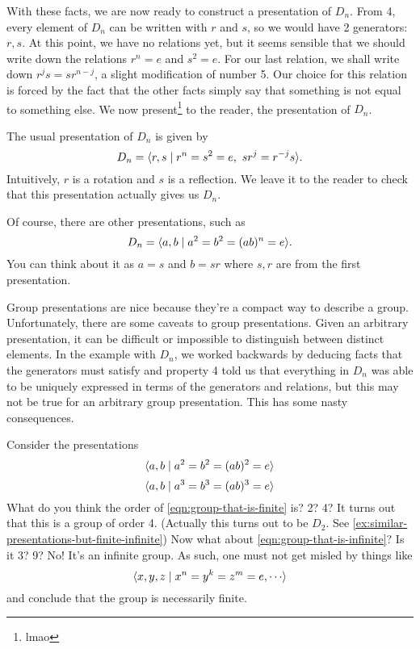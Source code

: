 \documentclass[./main.tex]{subfiles}
\begin{document}
With these facts, we are now ready to construct a presentation of $D_n$. From 4,
every element of $D_n$ can be written with $r$ and $s$, so we would have 2
generators: $r, s$. At this point, we have no relations yet, but it seems
sensible that we should write down the relations $r^n = e$ and $s^2 = e$. For
our last relation, we shall write down $r^j s = sr^{n-j}$, a slight modification
of number 5. Our choice for this relation is forced by the fact that the other
facts simply say that something is not equal to something else. We now
present\footnote{lmao} to the reader, the presentation of $D_n$.

\begin{example}[Presentation of $D_n$]
\label{example:presentation-of-dihedral}
    The usual presentation of $D_n$ is given by 
    \[
        D_n = { \langle r, s \mid r^n = s^2 = e, \,\, sr^j = r^{-j}s \rangle }.
    \]
    Intuitively, $r$ is a rotation and $s$ is a reflection. We leave it to the
    reader to check that this presentation actually gives us $D_n$. 

    Of course, there are other presentations, such as 
    \[
        D_n = { \langle a, b \mid a^2 = b^2 = (ab)^n = e \rangle }.
    \]
    You can think about it as $a=s$ and $b=sr$ where $s, r$ are from the first
    presentation.
\end{example}

Group presentations are nice because they're a compact way to describe a group.
Unfortunately, there are some caveats to group presentations. Given an arbitrary
presentation, it can be difficult or impossible to distinguish between distinct
elements. In the example with $D_n$, we worked backwards by deducing facts that
the generators must satisfy and property 4 told us that everything in $D_n$ was
able to be uniquely expressed in terms of the generators and relations, but this
may not be true for an arbitrary group presentation. This has some nasty
consequences. 

\begin{example}
    Consider the presentations
    \begin{equation}
    \label{eqn:group-that-is-finite}
    { \langle a, b \mid a^2 = b^2 = (ab)^2 = e \rangle }
    \end{equation}
    \begin{equation}
    \label{eqn:group-that-is-infinite}
    { \langle a, b \mid a^3 = b ^3 = (ab)^3 = e \rangle }
    \end{equation}
    What do you think the order of \cref{eqn:group-that-is-finite} is? 2? 4? It
    turns out that this is a group of order 4. (Actually this turns out to be
    $D_2$. See \cref{ex:similar-presentations-but-finite-infinite}) Now what
    about \cref{eqn:group-that-is-infinite}? Is it 3? 9? No! It's an infinite
    group. As such, one must not get misled by things like 
    \[
        \gen{x, y, z \mid x^n = y^k = z^m = e, \cdots}
    \]
    and conclude that the group is necessarily finite.
\end{example}
\end{document}
